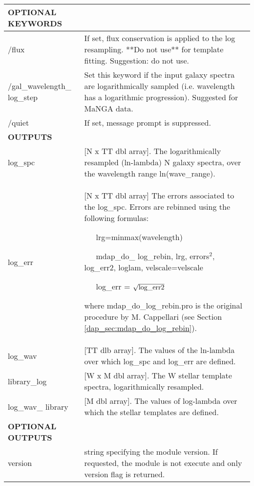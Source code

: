 \begin{center}
\begin{longtable}{p{2.7cm}| p{11.1cm}}
%
\hline
{\bf  OPTIONAL KEYWORDS}  & \\
\hline
/flux    &                  If set, flux conservation is applied to the log resampling. **Do not use** for template fitting. Suggestion: do not use.\\
%
/gal\_wavelength\_ log\_step &  Set this keyword if the input galaxy spectra are logarithmically sampled (i.e. wavelength has a logarithmic progression). 
                               Suggested for MaNGA data.\\
%
/quiet    &                    If set, message prompt is suppressed.\\
\hline
{\bf  OUTPUTS} &  \\
\hline
%
log\_spc  &  [N x TT dbl array]. The logarithmically resampled (ln-lambda) N galaxy spectra, over the wavelength range ln(wave\_range).\\
%
log\_err &   [N x TT dbl array]  The errors associated to the log\_spc. Errors are rebinned using the following formulas:


                              \ \ \   lrg=minmax(wavelength)

                              \ \ \   mdap\_do\_ log\_rebin, lrg, errors$^2$, log\_err2, loglam, velscale=velscale

                              \ \ \  log\_err = $\sqrt{{\rm log\_err2}}$

                             where mdap\_do\_log\_rebin.pro is the original procedure by M. Cappellari (see
                             Section \ref{dap_sec:mdap_do_log_rebin}).\\
%
log\_wav &   [TT dlb array].    The values of the ln-lambda over which log\_spc and log\_err are defined.\\
%
library\_log & [W x M dbl array]. The W stellar template spectra, logarithmically resampled.\\
%
log\_wav\_ library &[M dbl array]. The values of log-lambda over which the stellar templates are defined.\\
\hline
{\bf  OPTIONAL OUTPUTS} &  \\
\hline
version & string specifying the module version. If requested, the module is not execute and only version flag is returned.\\
\hline
\end{longtable}
\end{center}
